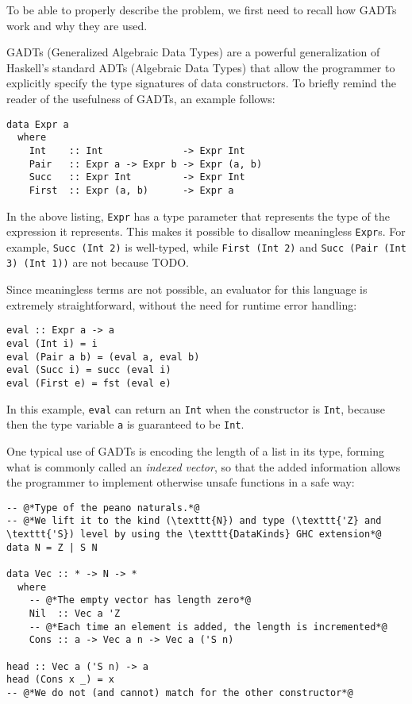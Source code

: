To be able to properly describe the problem, we first need to recall how GADTs work and why they are used.

GADTs (Generalized Algebraic Data Types) are a powerful generalization of Haskell's standard ADTs (Algebraic Data Types) that allow the programmer to explicitly specify the type signatures of data constructors. To briefly remind the reader of the usefulness of GADTs, an example follows:

\begin{lstlisting}[caption=A GADT describing a simple language with ints and pairs]
data Expr a
  where
    Int    :: Int              -> Expr Int
    Pair   :: Expr a -> Expr b -> Expr (a, b)
    Succ   :: Expr Int         -> Expr Int
    First  :: Expr (a, b)      -> Expr a
\end{lstlisting}

In the above listing, \texttt{Expr} has a type parameter that represents the type of the expression it represents.
This makes it possible to disallow meaningless \texttt{Expr}s.
For example, \texttt{Succ (Int 2)} is well-typed, while \texttt{First (Int 2)} and \texttt{Succ (Pair (Int 3) (Int 1))} are not because TODO.

Since meaningless terms are not possible, an evaluator for this language is extremely straightforward, without the need for runtime error handling:

\begin{lstlisting}[caption=Evaluator for \texttt{Expr}]
eval :: Expr a -> a
eval (Int i) = i
eval (Pair a b) = (eval a, eval b)
eval (Succ i) = succ (eval i)
eval (First e) = fst (eval e)
\end{lstlisting}

In this example, \texttt{eval} can return an \texttt{Int} when the constructor is \texttt{Int}, because then the type variable \texttt{a} is guaranteed to be \texttt{Int}.

One typical use of GADTs is encoding the length of a list in its type, forming what is commonly called an \emph{indexed vector}, so that the added information allows the programmer to implement otherwise unsafe functions in a safe way:

\begin{lstlisting}[caption=A length-indexed vector]
-- @*Type of the peano naturals.*@
-- @*We lift it to the kind (\texttt{N}) and type (\texttt{'Z} and \texttt{'S}) level by using the \texttt{DataKinds} GHC extension*@
data N = Z | S N

data Vec :: * -> N -> *
  where
    -- @*The empty vector has length zero*@
    Nil  :: Vec a 'Z
    -- @*Each time an element is added, the length is incremented*@
    Cons :: a -> Vec a n -> Vec a ('S n)

head :: Vec a ('S n) -> a
head (Cons x _) = x
-- @*We do not (and cannot) match for the other constructor*@
\end{lstlisting}

